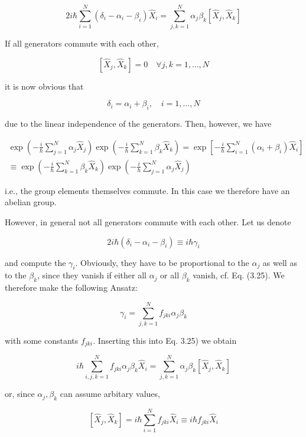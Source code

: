 \documentclass[10pt, letterpaper]{article}
\begin{document}
$$
2 i \hbar \sum_{i=1}^{N}\left(\delta_{i}-\alpha_{i}-\beta_{i}\right) \hat{X}_{i}=\sum_{j, k=1}^{N} \alpha_{j} \beta_{k}\left[\hat{X}_{j}, \hat{X}_{k}\right]
$$

If all generators commute with each other,

$$
\left[\hat{X}_{j}, \hat{X}_{k}\right]=0 \quad \forall j, k=1, \ldots, N
$$

it is now obvious that

$$
\delta_{i}=\alpha_{i}+\beta_{i}, \quad i=1, \ldots, N
$$

due to the linear independence of the generators. Then, however, we have

$$
\begin{gathered}
\exp \left(-\frac{i}{\hbar} \sum_{j=1}^{N} \alpha_{j} \hat{X}_{j}\right) \exp \left(-\frac{i}{\hbar} \sum_{k=1}^{N} \beta_{k} \hat{X}_{k}\right)=\exp \left[-\frac{i}{\hbar} \sum_{i=1}^{N}\left(\alpha_{i}+\beta_{i}\right) \hat{X}_{i}\right] \\
\equiv \exp \left(-\frac{i}{\hbar} \sum_{k=1}^{N} \beta_{k} \hat{X}_{k}\right) \exp \left(-\frac{i}{\hbar} \sum_{j=1}^{N} \alpha_{j} \hat{X}_{j}\right)
\end{gathered}
$$

i.e., the group elements themselves commute. In this case we therefore have an abelian group.

However, in general not all generators commute with each other. Let us denote

$$
2 i \hbar\left(\delta_{i}-\alpha_{i}-\beta_{i}\right) \equiv i \hbar \gamma_{i}
$$

and compute the $\gamma_{i}$. Obviously, they have to be proportional to the $\alpha_{j}$ as well as to the $\beta_{k}$, since they vanish if either all $\alpha_{j}$ or all $\beta_{k}$ vanish, cf. Eq. (3.25). We therefore make the following Ansatz:

$$
\gamma_{i}=\sum_{j, k=1}^{N} f_{j k i} \alpha_{j} \beta_{k}
$$

with some constants $f_{j k i}$. Inserting this into Eq. 3.25) we obtain

$$
i \hbar \sum_{i, j, k=1}^{N} f_{j k i} \alpha_{j} \beta_{k} \hat{X}_{i}=\sum_{j, k=1}^{N} \alpha_{j} \beta_{k}\left[\hat{X}_{j}, \hat{X}_{k}\right]
$$

or, since $\alpha_{j}, \beta_{k}$ can assume arbitary values,

$$
\left[\hat{X}_{j}, \hat{X}_{k}\right]=i \hbar \sum_{i=1}^{N} f_{j k i} \hat{X}_{i} \equiv i \hbar f_{j k i} \hat{X}_{i}
$$
\end{document}
